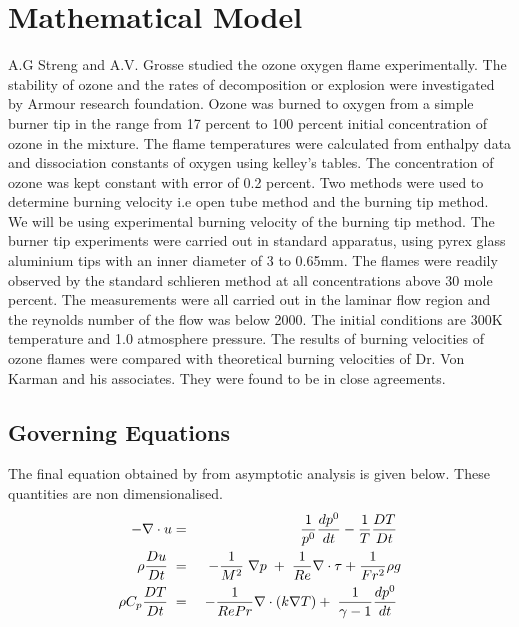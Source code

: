 \chapter{Mathematical Model}

\bigskip
\noindent A.G Streng and A.V. Grosse \cite{Streng}  studied the ozone oxygen flame experimentally. The stability of ozone and the rates of decomposition or explosion were investigated by Armour research foundation. Ozone was burned to oxygen from a simple burner tip in the range from 17 percent to 100 percent initial concentration of ozone in the mixture. The flame temperatures were calculated from enthalpy data and dissociation constants of oxygen using kelley's tables. The concentration of ozone was kept constant with error of   0.2 percent. Two methods were used to determine burning velocity i.e open tube method and the burning tip method. We will be using experimental burning velocity of the burning tip method. The burner tip experiments were carried out in standard apparatus, using pyrex glass aluminium tips with an inner diameter of 3 to 0.65mm. The flames were readily observed by the standard schlieren method at all concentrations above 30 mole percent. The measurements were all carried out in the laminar flow region and the reynolds number of the flow was below 2000. The initial conditions are 300K temperature and 1.0 atmosphere pressure. The results of burning velocities of ozone flames were compared with theoretical burning velocities of Dr. Von Karman and his associates. They were found to be in close agreements. 

\section{Governing Equations}


The final equation obtained by from asymptotic analysis is given below. These quantities are non dimensionalised. 
\begin{eqnarray}
-\nabla \cdot u &=& \frac{1}{p^0} \frac{d p^0}{d t} - \frac{1}{T}\frac{D T}{D t} \hspace{1mm}\\
\rho \frac{D u}{D t} \hspace{1mm} &=& -\frac{1}{M^2}\hspace{1mm}\nabla p\hspace{1mm}+\hspace{1mm}\frac{1}{Re}\nabla \cdot \tau + \frac{1}{Fr^2}\rho g \\
\rho C_p \frac{D T}{D t} \hspace{1mm}&=&\hspace{1mm} -  \frac{1}{Re Pr}\nabla\cdot (k \nabla T) + \hspace{1mm} \frac{1}{\gamma -1} \frac{d p^0}{d t}\hspace{1mm}\\
\end{eqnarray}



